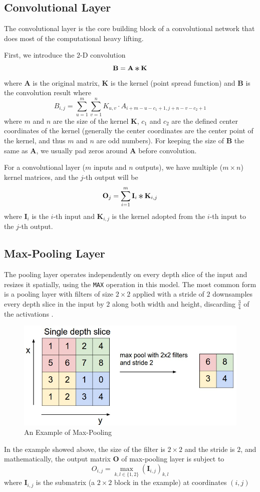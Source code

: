 \documentclass[10pt]{article}
\DeclareMathOperator*{\Conv}{\mathop{\scalebox{1.5}{\raisebox{-0.2ex}{$\ast$}}}}
\begin{document}
\subsection{Convolutional Layer}
The convolutional layer is the core building block of a convolutional network that does most of the computational heavy lifting.\par
First, we introduce the $2$-D convolution
$$\mathbf{B} = \mathbf{A}\Conv\mathbf{K}$$
where $\mathbf{A}$ is the original matrix, $\mathbf{K}$ is the kernel (point spread function) and $\mathbf{B}$ is the convolution result where
$$B_{i,j} = \sum\limits_{u = 1}^m\sum\limits_{v = 1}^nK_{u, v}\cdot A_{i+m-u-c_1+1,j+n-v-c_2+1}$$
where $m$ and $n$ are the size of the kernel $\mathbf{K}$, $c_1$ and $c_2$ are the defined center coordinates of the kernel (generally the center coordinates are the center point of the kernel, and thus $m$ and $n$ are odd numbers). For keeping the size of $\mathbf{B}$ the same as $\mathbf{A}$, we usually pad zeros around $\mathbf{A}$ before convolution.\par
For a convolutional layer ($m$ inputs and $n$ outputs), we have multiple ($m\times n$) kernel matrices, and the $j$-th output will be
$$\mathbf{O}_{j} = \sum\limits_{i = 1}^m\mathbf{I}_i\Conv\mathbf{K}_{i,j}$$
where $\mathbf{I}_i$ is the $i$-th input and $\mathbf{K}_{i,j}$ is the kernel adopted from the $i$-th input to the $j$-th output.
\subsection{Max-Pooling Layer}
The pooling layer operates independently on every depth slice of the input and resizes it spatially, using the \texttt{MAX} operation in this model. The most common form is a pooling layer with filters of size $2\times2$ applied with a stride of $2$ downsamples every depth slice in the input by $2$ along both width and height, discarding $\frac34$ of the activations \cite{nagi2011max}.
\begin{figure}[H]
\centering
\includegraphics[scale=.4]{maxpool.jpeg}
\caption{An Example of Max-Pooling}
\label{fig2}
\end{figure}
In the example showed above, the size of the filter is $2\times2$ and the stride is $2$, and mathematically, the output matrix $\mathbf{O}$ of max-pooling layer is subject to
$$O_{i,j} = \max_{k,l\in\{1,2\}}\left(\mathbf{I}_{i,j}\right)_{k,l}$$
where $\mathbf{I}_{i,j}$ is the submatrix (a $2\times2$ block in the example) at coordinates $\left(i,j\right)$
\end{document}
